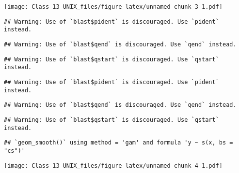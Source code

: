 \documentclass[
]{article}
\newenvironment{Shaded}{\begin{snugshade}}{\end{snugshade}}
\newcommand{\AttributeTok}[1]{\textcolor[rgb]{0.77,0.63,0.00}{#1}}
\newcommand{\FloatTok}[1]{\textcolor[rgb]{0.00,0.00,0.81}{#1}}
\newcommand{\FunctionTok}[1]{\textcolor[rgb]{0.00,0.00,0.00}{#1}}
\newcommand{\NormalTok}[1]{#1}
\newcommand{\SpecialCharTok}[1]{\textcolor[rgb]{0.00,0.00,0.00}{#1}}
\begin{document}
\texttt{[image: Class-13--UNIX\_files/figure-latex/unnamed-chunk-3-1.pdf]}

\begin{Shaded}
\end{Shaded}

\begin{verbatim}
## Warning: Use of `blast$pident` is discouraged. Use `pident` instead.
\end{verbatim}

\begin{verbatim}
## Warning: Use of `blast$qend` is discouraged. Use `qend` instead.
\end{verbatim}

\begin{verbatim}
## Warning: Use of `blast$qstart` is discouraged. Use `qstart` instead.
\end{verbatim}

\begin{verbatim}
## Warning: Use of `blast$pident` is discouraged. Use `pident` instead.
\end{verbatim}

\begin{verbatim}
## Warning: Use of `blast$qend` is discouraged. Use `qend` instead.
\end{verbatim}

\begin{verbatim}
## Warning: Use of `blast$qstart` is discouraged. Use `qstart` instead.
\end{verbatim}

\begin{verbatim}
## `geom_smooth()` using method = 'gam' and formula 'y ~ s(x, bs = "cs")'
\end{verbatim}

\texttt{[image: Class-13--UNIX\_files/figure-latex/unnamed-chunk-4-1.pdf]}
\end{document}
